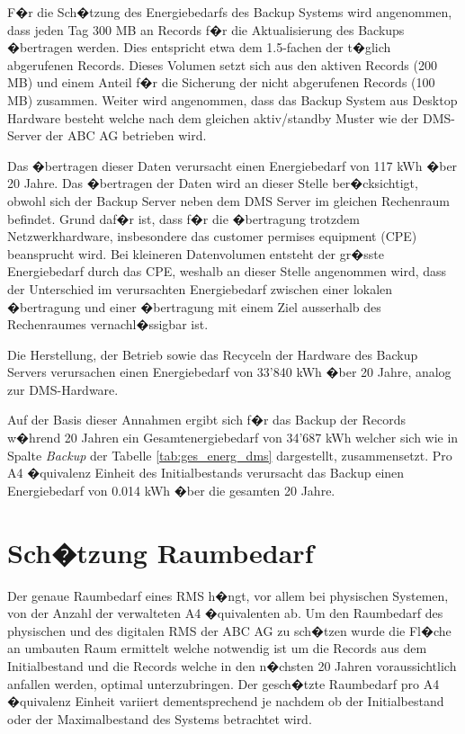 \documentclass[a4paper,twoside,10pt]{report}
\begin{document}
F�r die Sch�tzung des Energiebedarfs des Backup Systems wird angenommen, dass jeden Tag 300 MB an Records f�r die Aktualisierung des Backups �bertragen werden. Dies entspricht etwa dem 1.5-fachen der t�glich abgerufenen Records. Dieses Volumen setzt sich aus den aktiven Records (200 MB) und einem Anteil f�r die Sicherung der nicht abgerufenen Records (100 MB) zusammen. Weiter wird angenommen, dass das Backup System aus Desktop Hardware besteht welche nach dem gleichen aktiv/standby Muster wie der DMS-Server der ABC AG betrieben wird. 

Das �bertragen dieser Daten verursacht einen Energiebedarf von 117 kWh �ber 20 Jahre. Das �bertragen der Daten wird an dieser Stelle ber�cksichtigt, obwohl sich der Backup Server neben dem DMS Server im gleichen Rechenraum befindet. Grund daf�r ist, dass f�r die �bertragung trotzdem Netzwerkhardware, insbesondere das customer permises equipment (CPE) beansprucht wird. Bei kleineren Datenvolumen entsteht der gr�sste Energiebedarf durch das CPE, weshalb an dieser Stelle angenommen wird, dass der Unterschied im verursachten Energiebedarf zwischen einer lokalen �bertragung und einer �bertragung mit einem Ziel ausserhalb des Rechenraumes vernachl�ssigbar ist. \cite{cpe}

Die Herstellung, der Betrieb sowie das Recyceln der Hardware des Backup Servers verursachen einen Energiebedarf von 33'840 kWh �ber 20 Jahre, analog zur DMS-Hardware. 

Auf der Basis dieser Annahmen ergibt sich f�r das Backup der Records w�hrend 20 Jahren ein Gesamtenergiebedarf von 34'687 kWh welcher sich wie in Spalte \emph{Backup} der Tabelle \ref{tab:ges_energ_dms} dargestellt, zusammensetzt. Pro A4 �quivalenz Einheit des Initialbestands verursacht das Backup einen Energiebedarf von 0.014 kWh �ber die gesamten 20 Jahre.
 

\cleardoublepage
\acresetall
\chapter{Sch�tzung Raumbedarf}\label{vgl_raum}
Der genaue Raumbedarf eines \ac{RMS} h�ngt, vor allem bei physischen Systemen, von der Anzahl der verwalteten A4 �quivalenten ab. Um den Raumbedarf des physischen und des digitalen \ac{RMS} der ABC AG zu sch�tzen wurde die Fl�che an umbauten Raum ermittelt welche notwendig ist um die Records aus dem Initialbestand und die Records welche in den n�chsten 20 Jahren voraussichtlich anfallen werden, optimal unterzubringen. Der gesch�tzte Raumbedarf pro A4 �quivalenz Einheit variiert dementsprechend je nachdem ob der Initialbestand oder der Maximalbestand des Systems betrachtet wird. 
\end{document}
